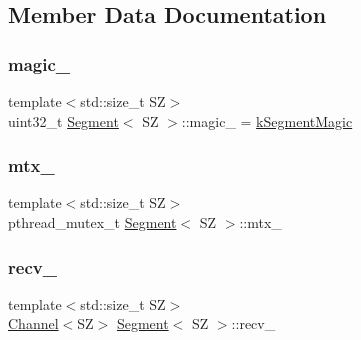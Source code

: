 \subsection{Member Data Documentation}
\mbox{\label{classSegment_abbfd0d6f6001b589b8dbc1e9ab837471}} 
\subsubsection{\texorpdfstring{magic\+\_\+}{magic\_}}
{\footnotesize\ttfamily template$<$std\+::size\+\_\+t SZ$>$ \\
uint32\+\_\+t \hyperlink{classSegment}{Segment}$<$ SZ $>$\+::magic\+\_\+ = \hyperlink{proxy_8hpp_af735db148c9e9f49d4feb7a4f5271b7a}{k\+Segment\+Magic}\hspace{0.3cm}{\ttfamily [private]}}

\mbox{\label{classSegment_af3cecd4372c6d3dc9aa482fa2da400e3}} 
\subsubsection{\texorpdfstring{mtx\+\_\+}{mtx\_}}
{\footnotesize\ttfamily template$<$std\+::size\+\_\+t SZ$>$ \\
pthread\+\_\+mutex\+\_\+t \hyperlink{classSegment}{Segment}$<$ SZ $>$\+::mtx\+\_\+\hspace{0.3cm}{\ttfamily [private]}}

\mbox{\label{classSegment_a9fee642411f628501a3b0a972120c282}} 
\subsubsection{\texorpdfstring{recv\+\_\+}{recv\_}}
{\footnotesize\ttfamily template$<$std\+::size\+\_\+t SZ$>$ \\
\hyperlink{classChannel}{Channel}$<$SZ$>$ \hyperlink{classSegment}{Segment}$<$ SZ $>$\+::recv\+\_\+\hspace{0.3cm}{\ttfamily [private]}}

\mbox{\label{classSegment_a237c718cfb7a495768efce6ca0c85c4c}} 
